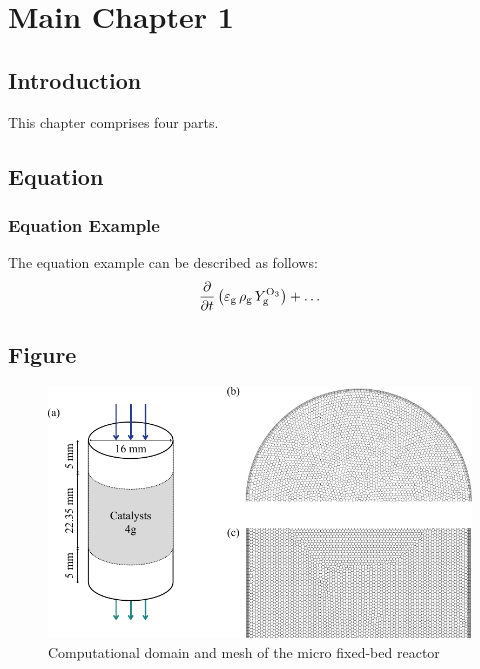 \chapter{Main Chapter 1}
\label{chap: reactive transport model}
\begin{refsection}
\normalsize

\section{Introduction}

This chapter comprises four parts. 

\section{Equation}
\label{sec:chap1: equation}
\subsection{Equation Example}
The equation example can be described as follows: 
\begin{equation}
    \pdv{t} \left( \varepsilon_{\mathrm{g}}\,\rho_{\mathrm{g}}\,Y_{\mathrm{g}}^{\ce{O3}} \right)
    + 
    \dots
    \label{eqn:chap1: equation example}
\end{equation}


\section{Figure}
\label{sec:chap1: Figure}
\begin{figure}[!htbp]
    \centering
    \includegraphics[width=.85\textwidth]{fig/chap_RxnMod-mesh_fixed_bed.pdf}
    \caption{Computational domain and mesh of the micro fixed-bed reactor}
    \label{fig:Chap1: mesh of micro-reactor}
\end{figure}


\end{refsection}
